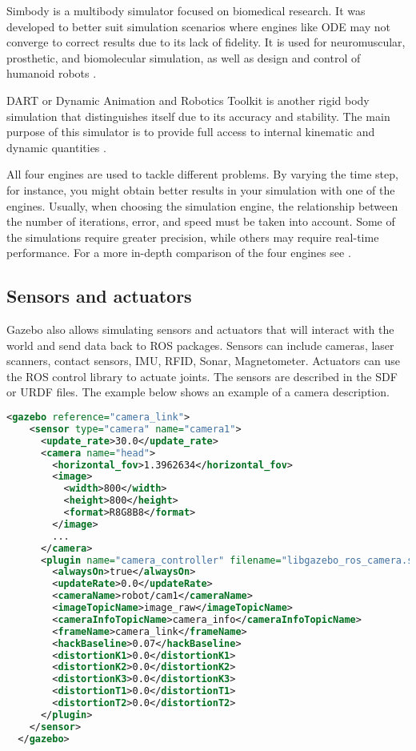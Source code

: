 Simbody is a multibody simulator focused on biomedical research. It was developed to better suit simulation scenarios where engines like ODE may not converge to correct results due to its lack of fidelity. It is used for neuromuscular, prosthetic, and biomolecular simulation, as well as design and control of humanoid robots \cite{sherman2011simbody}.

DART or Dynamic Animation and Robotics Toolkit is another rigid body simulation that distinguishes itself due to its accuracy and stability. The main purpose of this simulator is to provide full access to internal kinematic and dynamic quantities \cite{lee2018dart}.

All four engines are used to tackle different problems. By varying the time step, for instance, you might obtain better results in your simulation with one of the engines. Usually, when choosing the simulation engine, the relationship between the number of iterations, error, and speed must be taken into account. Some of the simulations require greater precision, while others may require real-time performance. For a more in-depth comparison of the four engines see \cite{peters2014comparison}.

\subsection{Sensors and actuators}

Gazebo also allows simulating sensors and actuators that will interact with the world and send data back to ROS packages. Sensors can include cameras, laser scanners, contact sensors, IMU, RFID, Sonar, Magnetometer. Actuators can use the ROS control library to actuate joints. The sensors are described in the SDF or URDF files. The example below shows an example of a camera description.

\begin{lstlisting}[caption=Exemple of a URDF file for a camera description., language=XML]
  <gazebo reference="camera_link">
    <sensor type="camera" name="camera1">
      <update_rate>30.0</update_rate>
      <camera name="head">
        <horizontal_fov>1.3962634</horizontal_fov>
        <image>
          <width>800</width>
          <height>800</height>
          <format>R8G8B8</format>
        </image>
        ...
      </camera>
      <plugin name="camera_controller" filename="libgazebo_ros_camera.so">
        <alwaysOn>true</alwaysOn>
        <updateRate>0.0</updateRate>
        <cameraName>robot/cam1</cameraName>
        <imageTopicName>image_raw</imageTopicName>
        <cameraInfoTopicName>camera_info</cameraInfoTopicName>
        <frameName>camera_link</frameName>
        <hackBaseline>0.07</hackBaseline>
        <distortionK1>0.0</distortionK1>
        <distortionK2>0.0</distortionK2>
        <distortionK3>0.0</distortionK3>
        <distortionT1>0.0</distortionT1>
        <distortionT2>0.0</distortionT2>
      </plugin>
    </sensor>
  </gazebo>
\end{lstlisting}

